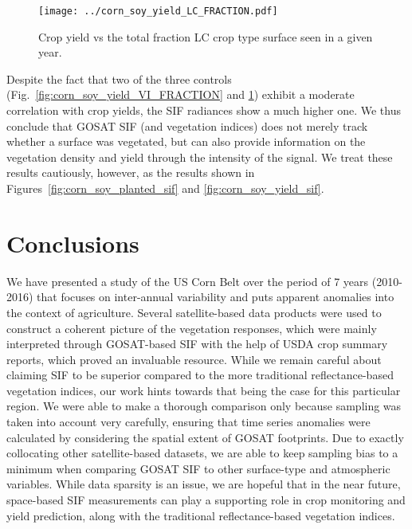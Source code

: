\documentclass[preprint, a4paper, 10pt, times, 5p]{elsarticle}
\begin{document}
\begin{figure}[htbp]
\centering
\texttt{[image: ../corn\_soy\_yield\_LC\_FRACTION.pdf]}
\caption{Crop yield vs the total fraction LC crop type surface seen in a given year.}
\label{fig:corn_soy_yield_LC_FRACTION}
\end{figure}

Despite the fact that two of the three controls (Fig.~\ref{fig:corn_soy_yield_VI_FRACTION} and \ref{fig:corn_soy_yield_LC_FRACTION}) exhibit a moderate correlation with crop yields, the SIF radiances show a much higher one. We thus conclude that GOSAT SIF (and vegetation indices) does not merely track whether a surface was vegetated, but can also provide information on the vegetation density and yield through the intensity of the signal. We treat these results cautiously, however, as the results shown in Figures~\ref{fig:corn_soy_planted_sif} and \ref{fig:corn_soy_yield_sif}.


\section{Conclusions}
We have presented a study of the US Corn Belt over the period of 7 years (2010-2016) that focuses on inter-annual variability and puts apparent anomalies into the context of agriculture. Several satellite-based data products were used to construct a coherent picture of the vegetation responses, which were mainly interpreted through GOSAT-based SIF with the help of USDA crop summary reports, which proved an invaluable resource. While we remain careful about claiming SIF to be superior compared to the more traditional reflectance-based vegetation indices, our work hints towards that being the case for this particular region. We were able to make a thorough comparison only because sampling was taken into account very carefully, ensuring that time series anomalies were calculated by considering the spatial extent of GOSAT footprints. Due to exactly collocating other satellite-based datasets, we are able to keep sampling bias to a minimum when comparing GOSAT SIF to other surface-type and atmospheric variables. While data sparsity is an issue, we are hopeful that in the near future, space-based SIF measurements can play a supporting role in crop monitoring and yield prediction, along with the traditional reflectance-based vegetation indices.
\end{document}
